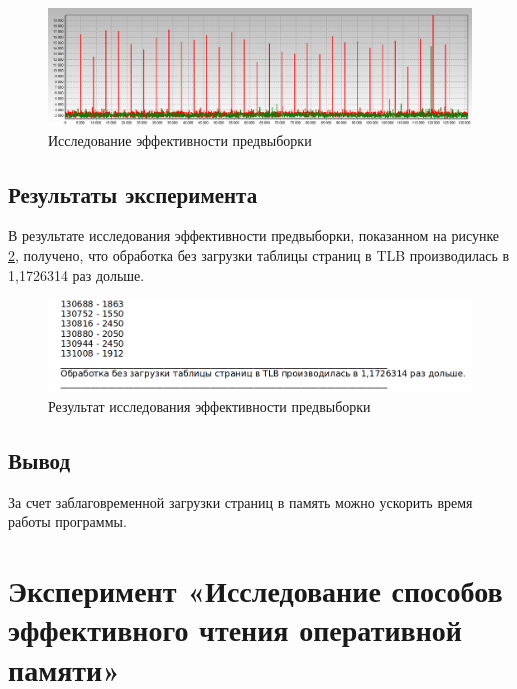 \begin{figure}[H]
	\begin{center}
		\includegraphics[scale=0.3]{img/effective.jpg}
	\end{center}
	\captionsetup{justification=centering}
	\caption{Исследование эффективности предвыборки}
	\label{img:effective}
\end{figure}

\section{Результаты эксперимента}

В результате исследования эффективности предвыборки, показанном на рисунке \ref{img:effective_result}, получено, что обработка без загрузки таблицы страниц в TLB производилась в 1,1726314 раз дольше.

\begin{figure}[H]
	\begin{center}
		\includegraphics[scale=0.3]{img/effective_result.png}
	\end{center}
	\captionsetup{justification=centering}
	\caption{Результат исследования эффективности предвыборки}
	\label{img:effective_result}
\end{figure}

\section{Вывод}

За счет заблаговременной загрузки страниц в память можно ускорить время работы программы.

\chapter{Эксперимент «Исследование способов эффективного чтения оперативной памяти»}

